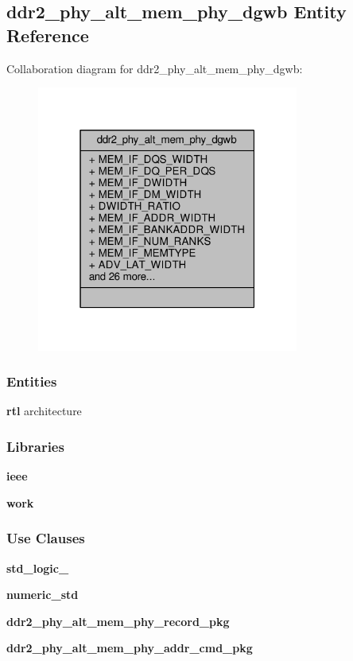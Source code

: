 \subsection{ddr2\+\_\+phy\+\_\+alt\+\_\+mem\+\_\+phy\+\_\+dgwb Entity Reference}
\label{classddr2__phy__alt__mem__phy__dgwb}


Collaboration diagram for ddr2\+\_\+phy\+\_\+alt\+\_\+mem\+\_\+phy\+\_\+dgwb\+:\nopagebreak
\begin{figure}[H]
\begin{center}
\leavevmode
\includegraphics[width=244pt]{d9/da1/classddr2__phy__alt__mem__phy__dgwb__coll__graph}
\end{center}
\end{figure}
\subsubsection*{Entities}
\begin{DoxyCompactItemize}
\item 
{\bf rtl} architecture
\end{DoxyCompactItemize}
\subsubsection*{Libraries}
 \begin{DoxyCompactItemize}
\item 
{\bf ieee} 
\item 
{\bf work} 
\end{DoxyCompactItemize}
\subsubsection*{Use Clauses}
 \begin{DoxyCompactItemize}
\item 
{\bf std\+\_\+logic\+\_}   
\item 
{\bf numeric\+\_\+std}   
\item 
{\bf ddr2\+\_\+phy\+\_\+alt\+\_\+mem\+\_\+phy\+\_\+record\+\_\+pkg}   
\item 
{\bf ddr2\+\_\+phy\+\_\+alt\+\_\+mem\+\_\+phy\+\_\+addr\+\_\+cmd\+\_\+pkg}   
\end{DoxyCompactItemize}
